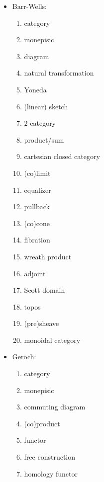 \documentclass[11pt,openany]{book}
\begin{document}
\begin{itemize}
\item Barr-Wells:~\cite{barr_wells_2020}
\begin{enumerate}
  \item category
  \item monepisic
  \item diagram
  \item natural transformation
  \item Yoneda
  \item (linear) sketch
  \item $2$-category
  \item product/sum
  \item cartesian closed category
  \item (co)limit
  \item equalizer
  \item pullback
  \item (co)cone
  \item fibration
  \item wreath product
  \item adjoint
  \item Scott domain
  \item topos
  \item (pre)sheave
  \item monoidal category
\end{enumerate}

\item Geroch:\cite{geroch_1985}
\begin{enumerate}
  \item category
  \item monepisic
  \item commuting diagram
  \item (co)product
  \item functor
  \item free construction
  \item homology functor
\end{enumerate}


\end{itemize}
\end{document}
